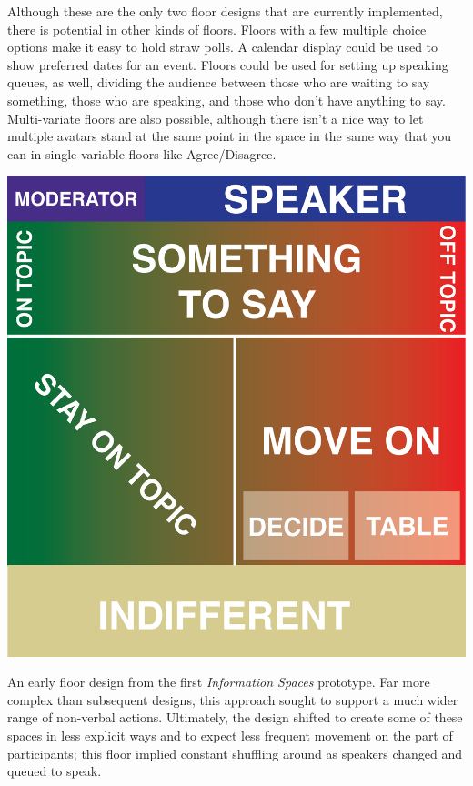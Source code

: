 Although these are the only two floor designs that are currently implemented, there is potential in other kinds of floors. Floors with a few multiple choice options make it easy to hold straw polls. A calendar display could be used to show preferred dates for an event. Floors could be used for setting up speaking queues, as well, dividing the audience between those who are waiting to say something, those who are speaking, and those who don't have anything to say. Multi-variate floors are also possible, although there isn't a nice way to let multiple avatars stand at the same point in the space in the same way that you can in single variable floors like Agree/Disagree.

\begin{marginfigure}
	\includegraphics{figures/agree-disagree-redux-floor.png}
	\caption{An early floor design from the first \emph{Information Spaces} prototype. Far more complex than subsequent designs, this approach sought to support a much wider range of non-verbal actions. Ultimately, the design shifted to create some of these spaces in less explicit ways and to expect less frequent movement on the part of participants; this floor implied constant shuffling around as speakers changed and queued to speak.}
	\label{fig:agree_disagree_initia_design}
\end{marginfigure}


